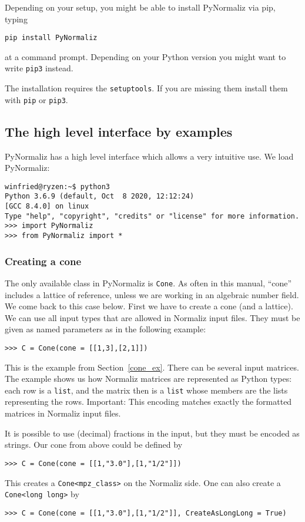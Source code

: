 \documentclass[12pt,a4paper]{scrartcl}
\theoremstyle{definition}
\begin{document}
\begin{small}
Depending on your setup, you might be able to install PyNormaliz via pip, typing
\begin{Verbatim}
pip install PyNormaliz
\end{Verbatim}
at a command prompt. Depending on your Python version you might want to write \verb|pip3| instead.

The installation requires the \verb|setuptools|. If you are missing them install them with \verb|pip| or \verb|pip3|.


\subsection{The high level interface by examples}

PyNormaliz has a high level interface which allows a very intuitive use. We load PyNormaliz:
\begin{Verbatim}
winfried@ryzen:~$ python3
Python 3.6.9 (default, Oct  8 2020, 12:12:24) 
[GCC 8.4.0] on linux
Type "help", "copyright", "credits" or "license" for more information.
>>> import PyNormaliz
>>> from PyNormaliz import *
\end{Verbatim}

\subsubsection{Creating a cone}

The only available class in PyNormaliz is \verb|Cone|. As often in this manual, ``cone'' includes a lattice of reference, unless we are working in an algebraic number field. We come back to this case below. First we have to create a cone (and a lattice). We can use all input types that are allowed in Normaliz input files. They must be given as named parameters as in the following example:
\begin{Verbatim}
>>> C = Cone(cone = [[1,3],[2,1]])
\end{Verbatim}
This is the example from Section~\ref{cone_ex}. There can be several input matrices. The example shows us how Normaliz matrices are represented as Python types: each row is a \verb|list|, and the matrix then is a \verb|list| whose members are the lists representing the rows. Important: This encoding matches exactly the formatted matrices in Normaliz input files.

It is possible to use (decimal) fractions in the input, but they must be encoded as strings. Our cone from above could be defined by
\begin{Verbatim}
>>> C = Cone(cone = [[1,"3.0"],[1,"1/2"]])
\end{Verbatim}
This creates a \verb|Cone<mpz_class>| on the Normaliz side. One can also create a \verb|Cone<long long>| by
\begin{Verbatim}
>>> C = Cone(cone = [[1,"3.0"],[1,"1/2"]], CreateAsLongLong = True)
\end{Verbatim}


\end{small}
\end{document}
